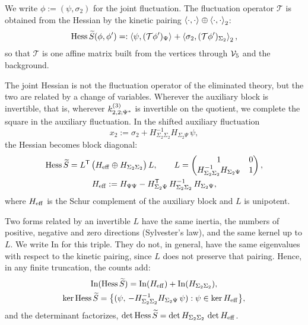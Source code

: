 We write $\phi := (\psi, \sigma_2)$ for the joint fluctuation.
The fluctuation operator $\mathcal T$ is obtained from the Hessian by the kinetic pairing $\pair{\cdot}{\cdot} \oplus \pair[2]{\cdot}{\cdot}$:
\begin{equation}
  \label{p:eq:sol:fluctuation-operator}
  \Hess \caction(\phi, \phi')
    =: \pair{\psi}{(\mathcal T \phi')_\Psi}
      + \pair[2]{\sigma_2}{(\mathcal T \phi')_{\Sigma_2}},
\end{equation}
so that $\mathcal T$ is one affine matrix built from the vertices through $\vertex{5}$ and the background.

The joint Hessian is not the fluctuation operator of the eliminated theory, but the two are related by a change of variables.
Wherever the auxiliary block is invertible, that is, wherever $\kin{2}{\Psi^*}{3}$ is invertible on the quotient, we complete the square in the auxiliary fluctuation.
In the shifted auxiliary fluctuation
\begin{equation}
  \label{p:eq:sol:shift}
  x_2
    := \sigma_2 + H_{\Sigma_2 \Sigma_2}^{-1} H_{\Sigma_2 \Psi} \, \psi,
\end{equation}
the Hessian becomes block diagonal:
\begin{equation}
  \label{p:eq:sol:congruence}
  \begin{gathered}
    \Hess \caction
      = L^{\mathsf T} \,
        \big( H_{\rm eff} \oplus H_{\Sigma_2 \Sigma_2} \big) \,
        L,
    \qquad
    L
      = \begin{pmatrix}
          1 & 0
          \\
          H_{\Sigma_2 \Sigma_2}^{-1} H_{\Sigma_2 \Psi} & 1
        \end{pmatrix},
    \\
    H_{\rm eff}
      := H_{\Psi \Psi}
        - H_{\Sigma_2 \Psi}^{\mathsf T} \, H_{\Sigma_2 \Sigma_2}^{-1} \, H_{\Sigma_2 \Psi},
  \end{gathered}
\end{equation}
where $H_{\rm eff}$ is the Schur complement of the auxiliary block and $L$ is unipotent.

Two forms related by an invertible $L$ have the same inertia, the numbers of positive, negative and zero directions (Sylvester's law), and the same kernel up to $L$.
We write $\mathrm{In}$ for this triple.
They do not, in general, have the same eigenvalues with respect to the kinetic pairing, since $L$ does not preserve that pairing.
Hence, in any finite truncation, the counts add:
\begin{equation}
  \label{p:eq:sol:inertia}
  \begin{gathered}
    \mathrm{In}(\Hess \caction)
      = \mathrm{In}(H_{\rm eff}) + \mathrm{In}(H_{\Sigma_2 \Sigma_2}),
    \\
    \ker \Hess \caction
      = \big\{ (\psi, \, - H_{\Sigma_2 \Sigma_2}^{-1} H_{\Sigma_2 \Psi} \, \psi) : \psi \in \ker H_{\rm eff} \big\},
  \end{gathered}
\end{equation}
and the determinant factorizes, $\det \Hess \caction = \det H_{\Sigma_2 \Sigma_2} \, \det H_{\rm eff}$.

